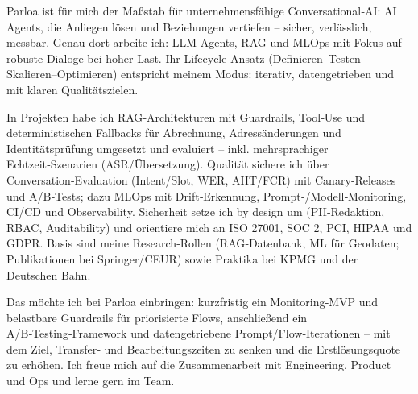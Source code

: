 Parloa ist für mich der Maßstab für unternehmensfähige Conversational‑AI: AI Agents, die Anliegen lösen und Beziehungen vertiefen – sicher, verlässlich, messbar. Genau dort arbeite ich: LLM‑Agents, RAG und MLOps mit Fokus auf robuste Dialoge bei hoher Last. Ihr Lifecycle‑Ansatz (Definieren–Testen–Skalieren–Optimieren) entspricht meinem Modus: iterativ, datengetrieben und mit klaren Qualitätszielen.

In Projekten habe ich RAG‑Architekturen mit Guardrails, Tool‑Use und deterministischen Fallbacks für Abrechnung, Adressänderungen und Identitätsprüfung umgesetzt und evaluiert – inkl. mehrsprachiger Echtzeit‑Szenarien (ASR/Übersetzung). Qualität sichere ich über Conversation‑Evaluation (Intent/Slot, WER, AHT/FCR) mit Canary‑Releases und A/B‑Tests; dazu MLOps mit Drift‑Erkennung, Prompt‑/Modell‑Monitoring, CI/CD und Observability. Sicherheit setze ich by design um (PII‑Redaktion, RBAC, Auditability) und orientiere mich an ISO 27001, SOC 2, PCI, HIPAA und GDPR. Basis sind meine Research‑Rollen (RAG‑Datenbank, ML für Geodaten; Publikationen bei Springer/CEUR) sowie Praktika bei KPMG und der Deutschen Bahn.

Das möchte ich bei Parloa einbringen: kurzfristig ein Monitoring‑MVP und belastbare Guardrails für priorisierte Flows, anschließend ein A/B‑Testing‑Framework und datengetriebene Prompt/Flow‑Iterationen – mit dem Ziel, Transfer‑ und Bearbeitungszeiten zu senken und die Erstlösungsquote zu erhöhen. Ich freue mich auf die Zusammenarbeit mit Engineering, Product und Ops und lerne gern im Team.